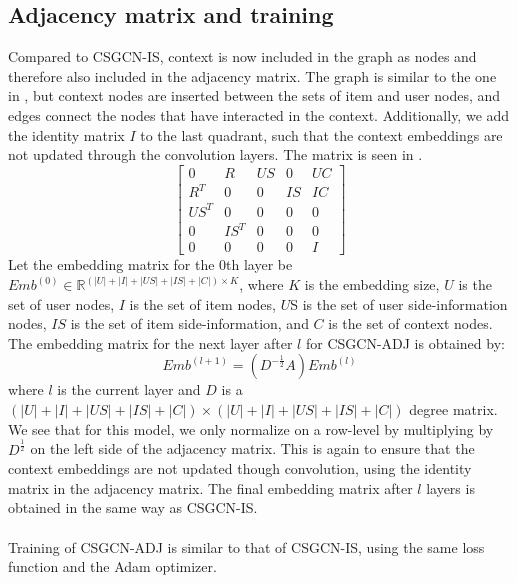\subsection{Adjacency matrix and training}\label{subsec:csgcn_adj_adj_mat}
Compared to CSGCN-IS, context is now included in the graph as nodes and therefore also included in the adjacency matrix.
The graph is similar to the one in , but context nodes are inserted between the sets of item and user nodes, and edges connect the nodes that have interacted in the context.
Additionally, we add the identity matrix $I$ to the last quadrant, such that the context embeddings are not updated through the convolution layers.
The matrix is seen in .
\begin{equation}\label{csgcn_adj_adj_mat}
    \begin{bmatrix}
    0 & R & US & 0 & UC\\
    R^T & 0 & 0 & IS & IC\\
    US^T & 0 & 0 & 0 & 0\\
    0 & IS^T & 0 & 0 & 0 \\
    0 & 0 & 0 & 0 & I
    \end{bmatrix}
\end{equation}
Let the embedding matrix for the 0th layer be $Emb^{(0)} \in \mathbb{R}^{(|U| + |I| + |US| + |IS| + |C|) \times K}$, where $K$ is the embedding size, $U$ is the set of user nodes, $I$ is the set of item nodes, $U$S is the set of user side-information nodes, $IS$ is the set of item side-information, and $C$ is the set of context nodes. The embedding matrix for the next layer after $l$ for CSGCN-ADJ is obtained by:
\begin{equation}
    Emb^{(l+1)} = (D^{-\frac{1}{2}}A)Emb^{(l)}
\end{equation}
where $l$ is the current layer and $D$ is a $(|U| + |I| + |US| + |IS| + |C|) \times (|U| + |I| + |US| + |IS|+ |C|)$ degree matrix. 
We see that for this model, we only normalize on a row-level by multiplying by $D^{\frac{1}{2}}$ on the left side of the adjacency matrix.
This is again to ensure that the context embeddings are not updated though convolution, using the identity matrix in the adjacency matrix.
The final embedding matrix after $l$ layers is obtained in the same way as CSGCN-IS.
\\\\
Training of CSGCN-ADJ is similar to that of CSGCN-IS, using the same loss function and the Adam optimizer.
